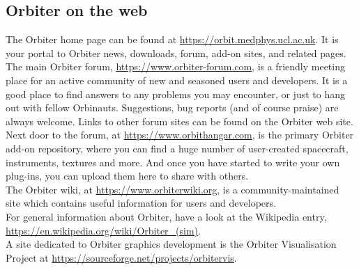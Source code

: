 \documentclass[Orbiter User Manual.tex]{subfiles}
\begin{document}
\subsection{Orbiter on the web}
The Orbiter home page can be found at \url{https://orbit.medphys.ucl.ac.uk}. It is your portal to Orbiter news, downloads, forum, add-on sites, and related pages.\\
The main Orbiter forum, \url{https://www.orbiter-forum.com}, is a friendly meeting place for an active community of new and seasoned users and developers. It is a good place to find answers to any problems you may encounter, or just to hang out with fellow Orbinauts. Suggestions, bug reports (and of course praise) are always welcome. Links to other forum sites can be found on the Orbiter web site.\\
Next door to the forum, at \url{https://www.orbithangar.com}, is the primary Orbiter add-on repository, where you can find a huge number of user-created spacecraft, instruments, textures and more. And once you have started to write your own plug-ins, you can upload them here to share with others.\\
The Orbiter wiki, at \url{https://www.orbiterwiki.org}, is a community-maintained site which contains useful information for users and developers.\\
For general information about Orbiter, have a look at the Wikipedia entry, \url{https://en.wikipedia.org/wiki/Orbiter_(sim)}.\\
A site dedicated to Orbiter graphics development is the Orbiter Visualisation Project at \url{https://sourceforge.net/projects/orbitervis}.
\end{document}
